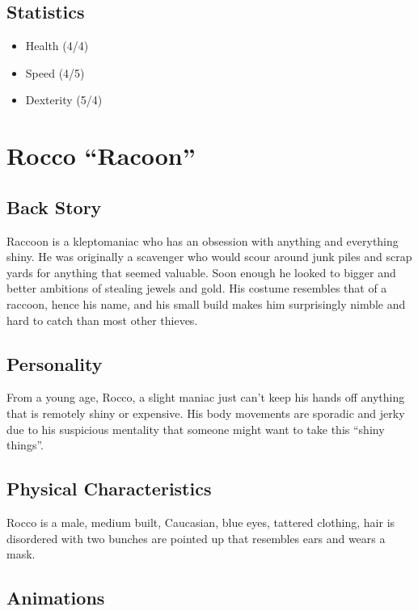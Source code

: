 \documentclass[14pt]{report}
\begin{document}
\subsection{Statistics}

\begin{itemize}
    \item Health (4/4)
    \item Speed (4/5)
    \item Dexterity (5/4)
\end{itemize}

\section{Rocco ``Racoon''}

\subsection{Back Story}

Raccoon is a kleptomaniac who has an obsession with anything and everything shiny. He was originally a scavenger who would scour around junk piles and scrap yards for anything that seemed valuable. Soon enough he looked to bigger and better ambitions of stealing jewels and gold. His costume resembles that of a raccoon, hence his name, and his small build makes him surprisingly nimble and hard to catch than most other thieves.

\subsection{Personality}

From a young age, Rocco, a slight maniac just can’t keep his hands off anything that is remotely shiny or expensive. His body movements are sporadic and jerky due to his suspicious mentality that someone might want to take this ``shiny things''.

\subsection{Physical Characteristics}

Rocco is a male, medium built, Caucasian, blue eyes, tattered clothing, hair is disordered with two bunches are pointed up that resembles ears and wears a mask.

\subsection{Animations}
\end{document}
